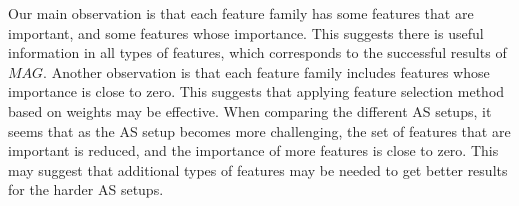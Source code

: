 \documentclass{ecai}
\newcommand{\Carmel}[1]{}
\newcommand{\Roni}[1]{}
\newcommand{\kaduri}[1]{\ensuremath{\textit{KBS}}\xspace}
\newcommand{\mapfgas}[1]{\ensuremath{\textit{MAG}}\xspace}
\begin{document}
Our main observation is that each feature family has some features that are important, and some features whose importance. This suggests there is useful information in all types of features, which corresponds to the successful results of \mapfgas\ . 
Another observation is that each feature family includes features whose importance is close to zero. This suggests that applying feature selection method based on weights may be effective. 
When comparing the different AS setups, it seems that as the AS setup becomes more challenging, the set of features that are important is reduced, and the importance of more features is close to zero. This may suggest that additional types of features  may be needed to get better results for the harder AS setups. 




\end{document}
